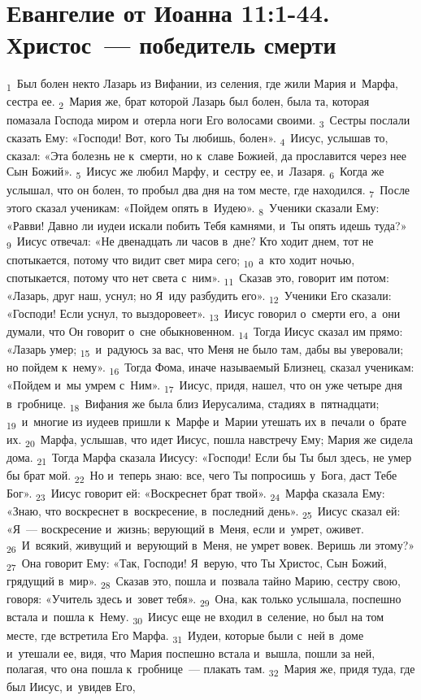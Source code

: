 \documentclass[a4paper,12pt]{article}
\begin{document}
\section{Евангелие от Иоанна 11:1-44. Христос~--- победитель смерти}

 \textsubscript{1}~Был болен некто Лазарь из Вифании, из селения, где жили Мария и~Марфа, сестра ее. \textsubscript{2}~Мария же, брат которой Лазарь был болен, была та, которая помазала Господа миром и~отерла ноги Его волосами своими. \textsubscript{3}~Сестры послали сказать Ему: «Господи! Вот, кого Ты любишь, болен». \textsubscript{4}~Иисус, услышав то, сказал: «Эта болезнь не к~смерти, но к~славе Божией, да прославится через нее Сын Божий». \textsubscript{5}~Иисус же любил Марфу, и~сестру ее, и~Лазаря. \textsubscript{6}~Когда же услышал, что он болен, то пробыл два дня на том месте, где находился. \textsubscript{7}~После этого сказал ученикам: «Пойдем опять в~Иудею». \textsubscript{8}~Ученики сказали Ему: «Равви! Давно ли иудеи искали побить Тебя камнями, и~Ты опять идешь туда?» \textsubscript{9}~Иисус отвечал: «Не двенадцать ли часов в~дне? Кто ходит днем, тот не спотыкается, потому что видит свет мира сего; \textsubscript{10}~а~кто ходит ночью, спотыкается, потому что нет света с~ним». \textsubscript{11}~Сказав это, говорит им потом: «Лазарь, друг наш, уснул; но Я~иду разбудить его». \textsubscript{12}~Ученики Его сказали: «Господи! Если уснул, то выздоровеет». \textsubscript{13}~Иисус говорил о~смерти его, а~они думали, что Он говорит о~сне обыкновенном. \textsubscript{14}~Тогда Иисус сказал им прямо: «Лазарь умер; \textsubscript{15}~и~радуюсь за вас, что Меня не было там, дабы вы уверовали; но пойдем к~нему». \textsubscript{16}~Тогда Фома, иначе называемый Близнец, сказал ученикам: «Пойдем и~мы умрем с~Ним». \textsubscript{17}~Иисус, придя, нашел, что он уже четыре дня в~гробнице. \textsubscript{18}~Вифания же была близ Иерусалима, стадиях в~пятнадцати; \textsubscript{19}~и~многие из иудеев пришли к~Марфе и~Марии утешать их в~печали о~брате их. \textsubscript{20}~Марфа, услышав, что идет Иисус, пошла навстречу Ему; Мария же сидела дома. \textsubscript{21}~Тогда Марфа сказала Иисусу: «Господи! Если бы Ты был здесь, не умер бы брат мой. \textsubscript{22}~Но и~теперь знаю: все, чего Ты попросишь у~Бога, даст Тебе Бог». \textsubscript{23}~Иисус говорит ей: «Воскреснет брат твой». \textsubscript{24}~Марфа сказала Ему: «Знаю, что воскреснет в~воскресение, в~последний день». \textsubscript{25}~Иисус сказал ей: «Я~--- воскресение и~жизнь; верующий в~Меня, если и~умрет, оживет. \textsubscript{26}~И~всякий, живущий и~верующий в~Меня, не умрет вовек. Веришь ли этому?» \textsubscript{27}~Она говорит Ему: «Так, Господи! Я~верую, что Ты Христос, Сын Божий, грядущий в~мир». \textsubscript{28}~Сказав это, пошла и~позвала тайно Марию, сестру свою, говоря: «Учитель здесь и~зовет тебя». \textsubscript{29}~Она, как только услышала, поспешно встала и~пошла к~Нему. \textsubscript{30}~Иисус еще не входил в~селение, но был на том месте, где встретила Его Марфа. \textsubscript{31}~Иудеи, которые были с~ней в~доме и~утешали ее, видя, что Мария поспешно встала и~вышла, пошли за ней, полагая, что она пошла к~гробнице~--- плакать там. \textsubscript{32}~Мария же, придя туда, где был Иисус, и~увидев Его, 
\end{document}
